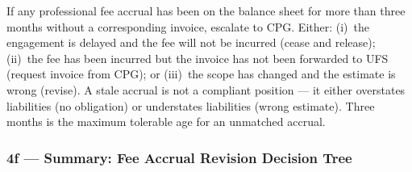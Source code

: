 \documentclass[10pt,a4paper]{article}
\begin{document}
\begin{note}
If any professional fee accrual has been on the balance sheet for more than three months without a corresponding invoice, escalate to CPG. Either: (i)~the engagement is delayed and the fee will not be incurred (cease and release); (ii)~the fee has been incurred but the invoice has not been forwarded to UFS (request invoice from CPG); or (iii)~the scope has changed and the estimate is wrong (revise). A stale accrual is not a compliant position --- it either overstates liabilities (no obligation) or understates liabilities (wrong estimate). Three months is the maximum tolerable age for an unmatched accrual.
\end{note}


\subsubsection{4f --- Summary: Fee Accrual Revision Decision Tree}
\label{sec:grp4f}
\end{document}
